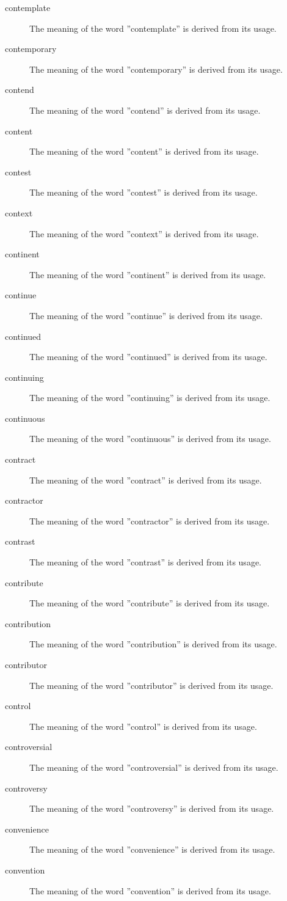\documentclass[12pt, letterpaper]{memoir}
\begin{document}
\begin{description}
\item[contemplate] The meaning of the word ''contemplate'' is derived from its usage.
\item[contemporary] The meaning of the word ''contemporary'' is derived from its usage.
\item[contend] The meaning of the word ''contend'' is derived from its usage.
\item[content] The meaning of the word ''content'' is derived from its usage.
\item[contest] The meaning of the word ''contest'' is derived from its usage.
\item[context] The meaning of the word ''context'' is derived from its usage.
\item[continent] The meaning of the word ''continent'' is derived from its usage.
\item[continue] The meaning of the word ''continue'' is derived from its usage.
\item[continued] The meaning of the word ''continued'' is derived from its usage.
\item[continuing] The meaning of the word ''continuing'' is derived from its usage.
\item[continuous] The meaning of the word ''continuous'' is derived from its usage.
\item[contract] The meaning of the word ''contract'' is derived from its usage.
\item[contractor] The meaning of the word ''contractor'' is derived from its usage.
\item[contrast] The meaning of the word ''contrast'' is derived from its usage.
\item[contribute] The meaning of the word ''contribute'' is derived from its usage.
\item[contribution] The meaning of the word ''contribution'' is derived from its usage.
\item[contributor] The meaning of the word ''contributor'' is derived from its usage.
\item[control] The meaning of the word ''control'' is derived from its usage.
\item[controversial] The meaning of the word ''controversial'' is derived from its usage.
\item[controversy] The meaning of the word ''controversy'' is derived from its usage.
\item[convenience] The meaning of the word ''convenience'' is derived from its usage.
\item[convention] The meaning of the word ''convention'' is derived from its usage.

\end{description}
\end{document}
